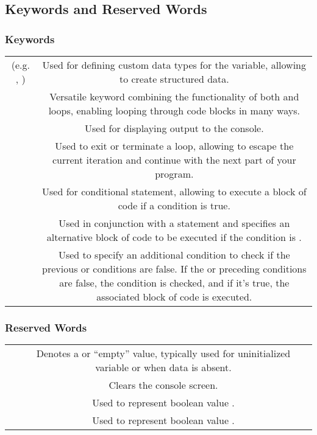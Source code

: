 \subsection{Keywords and Reserved Words}

\subsubsection{Keywords}
\begin{center}
  \begin{tabulary}{\linewidth}{|C|C|}
    \hline
     &  \\
    \hline
    \hline
     (e.g. , ) & Used for defining custom data types for the variable, allowing to create structured data. \\
    \hline
     & Versatile keyword combining the functionality of both  and  loops, enabling looping through code blocks in many ways. \\
    \hline
     & Used for displaying output to the console.\\
    \hline
     & Used to exit or terminate a loop, allowing to escape the current iteration and continue with the next part of your program. \\
    \hline
     & Used for conditional statement, allowing to execute a block of code if a condition is true.\\
    \hline
     & Used in conjunction with a  statement and specifies an alternative block of code to be executed if the  condition is .\\
    \hline
     & Used to specify an additional condition to check if the previous  or  conditions are false. If the  or preceding  conditions are false, the  condition is checked, and if it's true, the associated block of code is executed. \\
    \hline
  \end{tabulary}
\end{center}

\subsubsection{Reserved Words}
\begin{center}
  \begin{tabulary}{\linewidth}{|C|C|}
    \hline
     &  \\
    \hline
    \hline
     & Denotes a  or ``empty'' value, typically used for uninitialized variable or when data is absent. \\
    \hline
     & Clears the console screen. \\
    \hline
     & Used to represent boolean value . \\
    \hline
     & Used to represent boolean value .\\
    \hline
  \end{tabulary}
\end{center}
